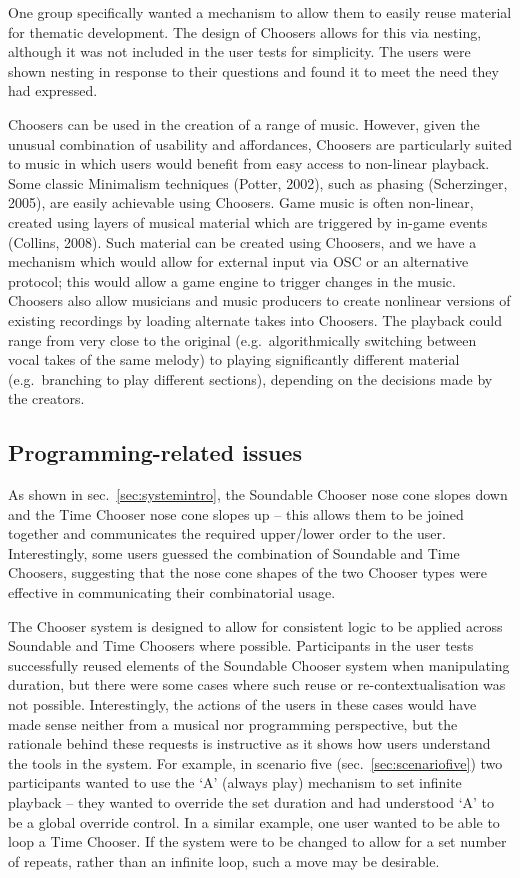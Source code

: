 \documentclass{ppig}
\begin{document}
One group specifically wanted a mechanism to allow them to easily reuse
material for thematic development. The design of Choosers allows for
this via nesting, although it was not included in the user tests for
simplicity. The users were shown nesting in response to their questions
and found it to meet the need they had expressed.

Choosers can be used in the creation of a range of music. However, given
the unusual combination of usability and affordances, Choosers are
particularly suited to music in which users would benefit from easy
access to non-linear playback. Some classic Minimalism techniques
(Potter, 2002), such as phasing (Scherzinger, 2005), are easily
achievable using Choosers. Game music is often non-linear, created using
layers of musical material which are triggered by in-game events
(Collins, 2008). Such material can be created using Choosers, and we
have a mechanism which would allow for external input via OSC or an
alternative protocol; this would allow a game engine to trigger changes
in the music. Choosers also allow musicians and music producers to
create nonlinear versions of existing recordings by loading alternate
takes into Choosers. The playback could range from very close to the
original (e.g.~algorithmically switching between vocal takes of the same
melody) to playing significantly different material (e.g.~branching to
play different sections), depending on the decisions made by the
creators.

\hypertarget{sec:programming}{%
\subsection{Programming-related issues}\label{sec:programming}}

As shown in sec.~\ref{sec:systemintro}, the Soundable Chooser nose cone
slopes down and the Time Chooser nose cone slopes up -- this allows them
to be joined together and communicates the required upper/lower order to
the user. Interestingly, some users guessed the combination of Soundable
and Time Choosers, suggesting that the nose cone shapes of the two
Chooser types were effective in communicating their combinatorial usage.

The Chooser system is designed to allow for consistent logic to be
applied across Soundable and Time Choosers where possible. Participants
in the user tests successfully reused elements of the Soundable Chooser
system when manipulating duration, but there were some cases where such
reuse or re-contextualisation was not possible. Interestingly, the
actions of the users in these cases would have made sense neither from a
musical nor programming perspective, but the rationale behind these
requests is instructive as it shows how users understand the tools in
the system. For example, in scenario five (sec.~\ref{sec:scenariofive})
two participants wanted to use the `A' (always play) mechanism to set
infinite playback -- they wanted to override the set duration and had
understood `A' to be a global override control. In a similar example,
one user wanted to be able to loop a Time Chooser. If the system were to
be changed to allow for a set number of repeats, rather than an infinite
loop, such a move may be desirable.
\end{document}
